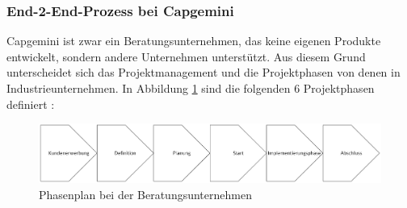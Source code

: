 \documentclass[a4paper, 12pt]{scrartcl}
\begin{document}
	\subsubsection{End-2-End-Prozess bei Capgemini}
Capgemini ist zwar ein Beratungsunternehmen, das keine eigenen Produkte entwickelt, sondern andere Unternehmen unterstützt. Aus diesem Grund unterscheidet sich das Projektmanagement und die Projektphasen von denen in Industrieunternehmen. In Abbildung \ref{Projektmanagment_Campgeini} sind die folgenden 6 Projektphasen definiert \cite{wegmann2006projektmanagement}:
	\begin{figure}[h!]
		\begin{center}
			\includegraphics[width=12cm]{Projektmanagement_Capgemini .png}
			\caption{Phasenplan bei der Beratungsunternehmen \cite{wegmann2006projektmanagement}}
			\label{Projektmanagment_Campgeini}
		\end{center}
	\end{figure}
\end{document}
